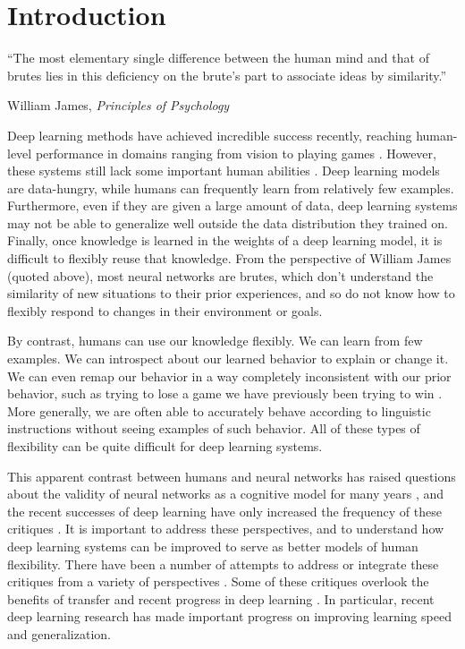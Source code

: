 \chapter{Introduction} \label{chapter:introduction}
\epigraph{``The most elementary single difference between the human mind and that of brutes lies in this deficiency on the brute's part to associate ideas by similarity.''}{William James, \textit{Principles of Psychology}}
Deep learning methods have achieved incredible success recently, reaching human-level performance in domains ranging from vision \citep[e.g.][]{Szegedy2015} to playing games \citep[e.g.][]{Silver2016}. However, these systems still lack some important human abilities \citep[e.g.][]{Lake2016}. Deep learning models are data-hungry, while humans can frequently learn from relatively few examples. Furthermore, even if they are given a large amount of data, deep learning systems may not be able to generalize well outside the data distribution they trained on. Finally, once knowledge is learned in the weights of a deep learning model, it is difficult to flexibly reuse that knowledge. From the perspective of William James (quoted above), most neural networks are brutes, which don't understand the similarity of new situations to their prior experiences, and so do not know how to flexibly respond to changes in their environment or goals. \par
By contrast, humans can use our knowledge flexibly. We can learn from few examples. We can introspect about our learned behavior to explain or change it. We can even remap our behavior in a way completely inconsistent with our prior behavior, such as trying to lose a game we have previously been trying to win \citep{Lake2016}. More generally, we are often able to accurately behave according to linguistic instructions without seeing examples of such behavior. All of these types of flexibility can be quite difficult for deep learning systems. \par 
This apparent contrast between humans and neural networks has raised questions about the validity of neural networks as a cognitive model for many years \citep[e.g.][]{Fodor1988}, and the recent successes of deep learning have only increased the frequency of these critiques \citep[e.g.][]{Lake2015, Lake2016, Lake2017, Marcus2018}. It is important to address these perspectives, and to understand how deep learning systems can be improved to serve as better models of human flexibility. There have been a number of attempts to address or integrate these critiques from a variety of perspectives \citep[e.g.][]{McClelland1999, McClelland2010, Hill2019a}. Some of these critiques overlook the benefits of transfer \citep{Lampinen2017a} and recent progress in deep learning \citep{Hansen2017}. In particular, recent deep learning research has made important progress on improving learning speed and generalization. \par
